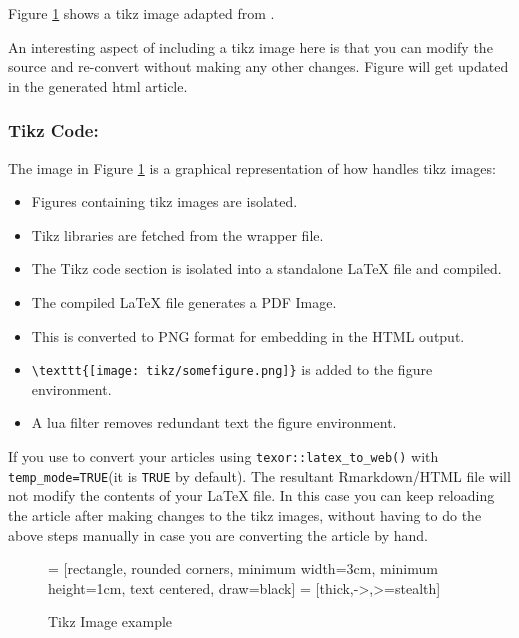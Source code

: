 Figure \ref{fig:tikz} shows a tikz image adapted from \citep{casflow}.


An interesting aspect of including a tikz image here is that you can modify the
source and re-convert without making any other changes. Figure will get updated
in the generated html article.

\subsubsection{Tikz Code:}
The image in Figure  \ref{fig:tikz} is a graphical representation of how  handles tikz images:

\begin{itemize}
\item Figures containing tikz images are isolated.
\item Tikz libraries are fetched from the wrapper file.
\item The Tikz code section is isolated into a standalone LaTeX file and compiled.
\item The compiled LaTeX file generates a PDF Image.
\item This is converted to PNG format for embedding in the HTML output.
\item \verb|\texttt{[image: tikz/somefigure.png]}| is added to the figure environment.
\item A lua filter removes redundant text the figure environment.
\end{itemize}

If you use  to convert your articles using \verb|texor::latex_to_web()| with \verb|temp_mode=TRUE|(it is \verb|TRUE| by default). The resultant Rmarkdown/HTML file will not modify the contents of your LaTeX file. In this case you can keep reloading the article after making changes to the tikz images, without having to do the above steps manually in case you are converting the article by hand.

\begin{figure}

  \centering
{} = [rectangle, rounded corners,
minimum width=3cm, 
minimum height=1cm,
text centered, 
draw=black]
 = [thick,->,>=stealth]
\caption{Tikz Image example}
  \label{fig:tikz}
\end{figure}


